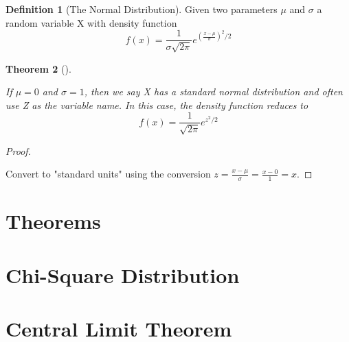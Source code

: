 \documentclass[10pt,]{book}
\theoremstyle{plain}
\newtheorem{theorem}{Theorem}[section]
\theoremstyle{definition}
\newtheorem{definition}[theorem]{Definition}
\theoremstyle{definition}
\numberwithin{equation}{section}
\begin{document}
	\begin{definition}[The Normal Distribution]\label{definition-13}
Given two parameters \(\mu\) and \(\sigma\) a random variable X with density function
	\begin{equation*}
	f(x) = \frac{1}{\sigma \sqrt{2 \pi}} e^{ \left ( \frac{x-\mu}{\sigma} \right ) ^2 / 2}
	\end{equation*}\end{definition}
\begin{theorem}[]\label{theorem-28}

	If \(\mu =0\) and \(\sigma=1\), then we say X has a standard normal distribution and often use Z as the variable name. In this case, the density function reduces to
	\begin{equation*}
	f(x) = \frac{1}{\sqrt{2 \pi}} e^{ z^2 / 2}
	\end{equation*}\end{theorem}
\begin{proof}\hypertarget{proof-19}{}
Convert to "standard units" using the conversion \(z = \frac{x-\mu}{\sigma} = \frac{x-0}{1} = x\).%
\end{proof}
\typeout{************************************************}
\typeout{************************************************}
\section[Theorems]{Theorems}\label{section-26}
\typeout{************************************************}
\typeout{************************************************}
\section[Chi-Square Distribution]{Chi-Square Distribution}\label{section-27}
\typeout{************************************************}
\typeout{************************************************}
\section[Central Limit Theorem]{Central Limit Theorem}\label{section-28}
\typeout{************************************************}
\typeout{************************************************}
\subsection[]{}\label{subsection-27}
\end{document}
